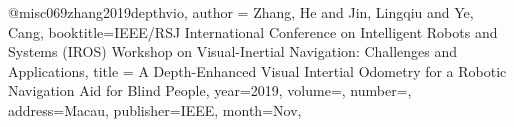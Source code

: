 @misc{069zhang2019depthvio,
author = {Zhang, He and Jin, Lingqiu and Ye, Cang},
booktitle={IEEE/RSJ International Conference on Intelligent Robots and Systems (IROS) Workshop on Visual-Inertial Navigation: Challenges and Applications}, 
title = {A Depth-Enhanced Visual Intertial Odometry for a Robotic Navigation Aid for Blind People},
year={2019},
volume={},
number={},
address={Macau},
publisher={IEEE},
month={Nov},}